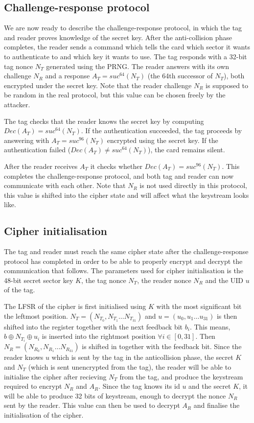 \documentclass[10pt,twocolumn]{article}
\begin{document}
\subsection{Challenge-response protocol}
\label{challenge-response}
We are now ready to describe the challenge-response protocol, in which the tag and reader proves knowledge of the secret key. After the anti-collision phase 
completes, the reader sends a command which tells the card which sector it wants to authenticate to and which key it wants to use. The tag responds with a 32-bit tag nonce $N_T$ generated using the PRNG. The reader answers with its own challenge $N_R$ and a response $A_T = suc^{64}(N_T)$ (the 64th successor of $N_T$), both encrypted under the secret key. Note that the reader challenge $N_R$ is supposed to be random in the real protocol, but this value can be chosen freely by the attacker. 

The tag checks that the reader knows the secret key by computing $Dec(A_T) = suc^{64}(N_T)$. If the authentication succeeded, the tag proceeds by answering with $A_T = suc^{96}(N_T)$ encrypted using the secret key. If the authentication failed ($Dec(A_T) \neq suc^{64}(N_T)$), the card remains silent.

After the reader receives $A_T$ it checks whether $Dec(A_T) = suc^{96}(N_T)$. This completes the challenge-response protocol, and both tag and reader can now communicate with each other. Note that $N_R$ is not used directly in this protocol, this value is shifted into the cipher state and will affect what the keystream looks like.

\subsection{Cipher initialisation}
The tag and reader must reach the same cipher state after the challenge-response protocol has completed in order to be able to properly encrypt and decrypt the communication that follows. The parameters used for cipher initialisation is the 48-bit secret sector key $K$, the tag nonce $N_T$, the reader nonce $N_R$ and the UID $u$ of the tag. 

The LFSR of the cipher is first initialised using $K$ with the most significant bit the leftmost position. $N_T = (N_{T_0}, N_{T_1} \ldots N_{T_{31}})$ and $u = (u_0, u_1 \ldots u_{31})$ is then shifted into the register together with the next feedback bit $b_i$. This means, $b \oplus N_{T_i} \oplus u_i$ is inserted into the rightmost position $\forall i \in [0, 31]$. Then $N_R = (N_{R_0}, N_{R_1} \ldots N_{R_31})$ is shifted in together with the feedback bit. Since the reader knows $u$ which is sent by the tag in the anticollision phase, the secret $K$ and $N_T$ (which is sent unencrypted from the tag), the reader will be able to initialise the cipher after recieving $N_T$ from the tag, and produce the keystream required to encrypt $N_R$ and $A_R$. Since the tag knows its id $u$ and the secret $K$, it will be able to produce 32 bits of keystream, enough to decrypt the nonce $N_R$ sent by the reader. This value can then be used to decrypt $A_R$ and finalise the initialisation of the cipher. 
\end{document}

